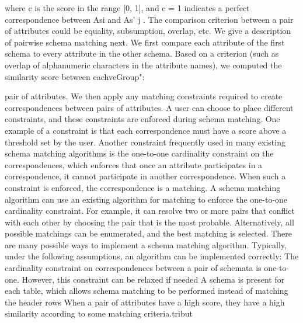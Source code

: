 where c is the score in the range [0, 1], and c = 1 indicates a perfect correspondence between Asi and As' j . The comparison criterion between a pair of attributes could be equality, subsumption, overlap, etc.
We give a description of pairwise schema matching next. We first compare each attribute of the first schema to every attribute in the other schema. Based on a criterion (such as overlap of alphanumeric characters in the attribute names), we computed the similarity score between eachveGroup":

pair of attributes. We then apply any matching constraints required to create correspondences between pairs of attributes. A user can choose to place different constraints, and these constraints are enforced during schema matching. One example of a constraint is that each correspondence must have a score above a threshold set by the user.
Another constraint frequently used in many existing schema matching algorithms is the one-to-one cardinality constraint on the correspondences, which enforces that once an attribute participates in a correspondence, it cannot participate in another correspondence. When such a constraint is enforced, the correspondence is a matching. A schema matching algorithm can use an existing algorithm for matching to enforce the one-to-one cardinality constraint. For example, it can resolve two or more pairs that conflict with each other by choosing the pair that is the most probable. Alternatively, all possible matchings can be enumerated, and the best matching is selected.
There are many possible ways to implement a schema matching algorithm. Typically, under the following assumptions, an algorithm can be implemented correctly:
 The cardinality constraint on correspondences between a pair of schemata is one-to-one. However, this constraint can be relaxed if needed
 A schema is present for each table, which allows schema matching to be performed instead of matching the header rows
 When a pair of attributes have a high score, they have a high similarity according to some matching criteria.tribut

